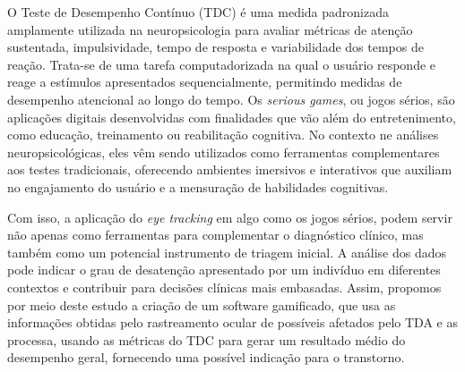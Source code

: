 O Teste de Desempenho Contínuo (TDC) é uma medida padronizada amplamente
utilizada na neuropsicologia para avaliar métricas de atenção sustentada, impulsividade,
tempo de resposta e variabilidade dos tempos de reação. Trata-se de uma tarefa
computadorizada na qual o usuário responde e reage a estímulos apresentados
sequencialmente, permitindo medidas de desempenho atencional ao longo do tempo. Os
\textit{serious games}, ou jogos sérios, são aplicações digitais desenvolvidas com finalidades que
vão além do entretenimento, como educação, treinamento ou reabilitação cognitiva. No
contexto ne análises neuropsicológicas, eles vêm sendo utilizados como ferramentas
complementares aos testes tradicionais, oferecendo ambientes imersivos e interativos que
auxiliam no engajamento do usuário e a mensuração de habilidades cognitivas.

Com isso, a aplicação do \textit{eye tracking} em algo como os jogos sérios, podem servir não
apenas como ferramentas para complementar o diagnóstico clínico, mas também como um
potencial instrumento de triagem inicial. A análise dos dados pode indicar o grau de
desatenção apresentado por um indivíduo em diferentes contextos e contribuir para decisões
clínicas mais embasadas. Assim, propomos por meio deste estudo a criação de um software
gamificado, que usa as informações obtidas pelo rastreamento ocular de possíveis afetados
pelo TDA e as processa, usando as métricas do TDC para gerar um resultado médio do
desempenho geral, fornecendo uma possível indicação para o transtorno.